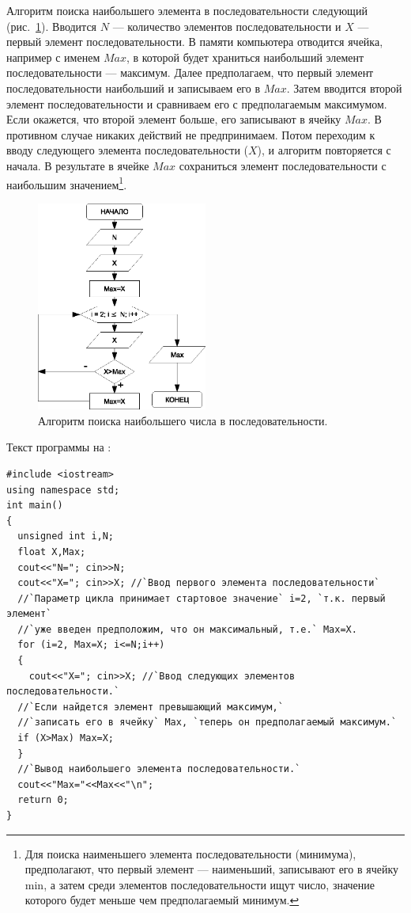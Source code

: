 Алгоритм поиска наибольшего элемента в последовательности следующий (рис.~\ref{ch03:refDrawing33}). 
Вводится $N$ --- количество элементов последовательности и $X$ --- первый элемент последовательности. 
В памяти компьютера отводится ячейка, например с
именем $Max$, в которой будет храниться наибольший элемент последовательности --- максимум. Далее
предполагаем, что первый элемент последовательности наибольший и записываем его в $Max$. Затем
вводится второй элемент последовательности и сравниваем его с предполагаемым максимумом. Если окажется, что второй
элемент больше, его записывают в ячейку $Max$. В противном случае никаких действий не предпринимаем.
Потом переходим к вводу следующего элемента последовательности ($X$), и алгоритм повторяется с начала. В результате в
ячейке $Max$ сохраниться элемент последовательности с наибольшим значением\footnote{Для поиска
наименьшего элемента последовательности (минимума), предполагают, что первый элемент --- наименьший, записывают его в
ячейку min, а затем среди элементов последовательности ищут число, значение которого будет меньше чем предполагаемый
минимум.}.

\begin{figure}[htb]
\begin{center}
\includegraphics[width=0.5\textwidth]{img/ris_3_34}
\caption{Алгоритм поиска наибольшего числа в последовательности.}
\label{ch03:refDrawing33}
\end{center}
\end{figure}

Текст программы на :
\begin{lstlisting}
#include <iostream>
using namespace std;
int main()
{
  unsigned int i,N;
  float X,Max;
  cout<<"N="; cin>>N;
  cout<<"X="; cin>>X; //`Ввод первого элемента последовательности`
  //`Параметр цикла принимает стартовое значение` i=2, `т.к. первый элемент`
  //`уже введен предположим, что он максимальный, т.е.` Max=X.
  for (i=2, Max=X; i<=N;i++)
  {
    cout<<"X="; cin>>X; //`Ввод следующих элементов последовательности.`
  //`Если найдется элемент превышающий максимум,`
  //`записать его в ячейку` Max, `теперь он предполагаемый максимум.`
  if (X>Max) Max=X;
  }
  //`Вывод наибольшего элемента последовательности.`
  cout<<"Max="<<Max<<"\n";
  return 0;
}
\end{lstlisting}

